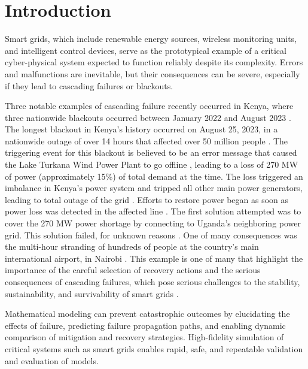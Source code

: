 \documentclass[runningheads]{llncs}
\begin{document}
\section{Introduction}

Smart grids, which include renewable energy sources, wireless monitoring units, and intelligent control devices, serve as the prototypical example of a critical cyber-physical system expected to function reliably despite its complexity. Errors and malfunctions are inevitable, but their consequences can be severe, especially if they lead to cascading failures or blackouts. 

Three notable examples of cascading failure recently occurred in Kenya, where three nationwide blackouts occurred between January 2022 and August 2023 \cite {apkenya_dec23}. The longest blackout in Kenya's  history occurred on August 25, 2023, in a nationwide outage of over 14 hours that affected over 50 million people \cite{apkenya_dec23}. The triggering event for this blackout is believed to be an error message that caused the Lake Turkana Wind Power Plant to go offline \cite{apkenya_aug23}, leading to a loss of 270 MW of power (approximately 15\%) of total demand at the time. The loss triggered an imbalance in Kenya's power system and tripped all other main power generators, leading to total outage of the grid \cite {mwangi_kenya_2023}. Efforts to restore power began as soon as power loss was detected in the affected line \cite{mwangi_kenya_2023}. The first solution attempted was to cover the 270 MW power shortage by connecting to Uganda's neighboring power grid. This solution failed, for unknown reasons \cite{apkenya_aug23}. One of many consequences was the multi-hour stranding of hundreds of people at the country's main international airport, in Nairobi \cite{apkenya_aug23}. This example is one of many that highlight the importance of the careful selection of recovery actions and the serious consequences of cascading failures, which pose serious challenges to the stability, sustainability, and survivability of smart grids \cite{xiaohui_review_2016}. 

Mathematical modeling can prevent catastrophic outcomes by elucidating the effects of failure,  predicting failure propagation paths, and enabling dynamic comparison of mitigation and recovery strategies. High-fidelity simulation of critical systems such as smart grids enables rapid, safe, and repeatable validation and evaluation of models. 
\end{document}
